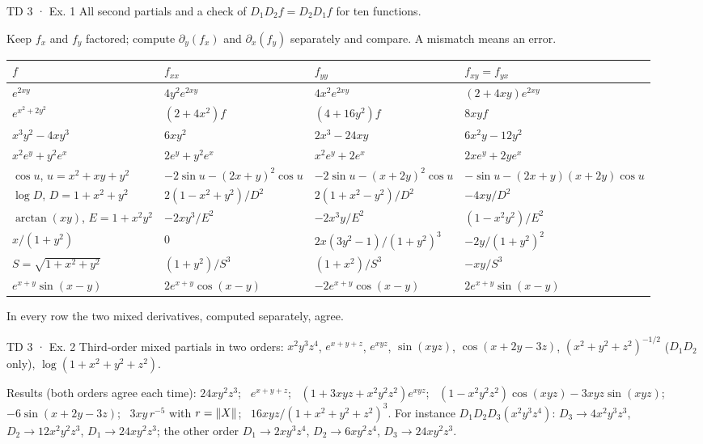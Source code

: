 \begin{problem}{TD 3 · Ex. 1}
All second partials and a check of $D_1D_2f=D_2D_1f$ for ten functions.
\end{problem}
\begin{hint}Keep $f_x$ and $f_y$ factored; compute $\partial_y(f_x)$ and $\partial_x(f_y)$ separately and
compare. A mismatch means an error.\end{hint}
\begin{solution}
\begin{center}\small
\begin{tabularx}{\linewidth}{@{}l Y Y Y@{}}
\toprule
$f$ & $f_{xx}$ & $f_{yy}$ & $f_{xy}=f_{yx}$\\ \midrule
$e^{2xy}$ & $4y^2e^{2xy}$ & $4x^2e^{2xy}$ & $(2+4xy)e^{2xy}$\\
$e^{x^2+2y^2}$ & $(2+4x^2)f$ & $(4+16y^2)f$ & $8xyf$\\
$x^3y^2-4xy^3$ & $6xy^2$ & $2x^3-24xy$ & $6x^2y-12y^2$\\
$x^2e^y+y^2e^x$ & $2e^y+y^2e^x$ & $x^2e^y+2e^x$ & $2xe^y+2ye^x$\\
$\cos u$, $u=x^2{+}xy{+}y^2$ & $-2\sin u-(2x{+}y)^2\cos u$ & $-2\sin u-(x{+}2y)^2\cos u$ & $-\sin u-(2x{+}y)(x{+}2y)\cos u$\\
$\log D$, $D=1{+}x^2{+}y^2$ & $2(1-x^2+y^2)/D^2$ & $2(1+x^2-y^2)/D^2$ & $-4xy/D^2$\\
$\arctan(xy)$, $E=1{+}x^2y^2$ & $-2xy^3/E^2$ & $-2x^3y/E^2$ & $(1-x^2y^2)/E^2$\\
$x/(1+y^2)$ & $0$ & $2x(3y^2-1)/(1+y^2)^3$ & $-2y/(1+y^2)^2$\\
$S=\sqrt{1+x^2+y^2}$ & $(1+y^2)/S^3$ & $(1+x^2)/S^3$ & $-xy/S^3$\\
$e^{x+y}\sin(x-y)$ & $2e^{x+y}\cos(x-y)$ & $-2e^{x+y}\cos(x-y)$ & $2e^{x+y}\sin(x-y)$\\
\bottomrule
\end{tabularx}
\end{center}
In every row the two mixed derivatives, computed separately, agree.
\end{solution}

\begin{problem}{TD 3 · Ex. 2}
Third-order mixed partials in two orders: $x^2y^3z^4$, $e^{x+y+z}$, $e^{xyz}$, $\sin(xyz)$,
$\cos(x+2y-3z)$, $(x^2+y^2+z^2)^{-1/2}$ ($D_1D_2$ only), $\log(1+x^2+y^2+z^2)$.
\end{problem}
\begin{solution}
Results (both orders agree each time): $24xy^2z^3$; \ $e^{x+y+z}$; \
$(1+3xyz+x^2y^2z^2)e^{xyz}$; \ $(1-x^2y^2z^2)\cos(xyz)-3xyz\sin(xyz)$; \ $-6\sin(x+2y-3z)$;
\ $3xy\,r^{-5}$ with $r=\left\lVert X\right\rVert$; \ $16xyz/(1+x^2+y^2+z^2)^3$.
For instance $D_1D_2D_3(x^2y^3z^4)$: $D_3\to4x^2y^3z^3$, $D_2\to12x^2y^2z^3$, $D_1\to24xy^2z^3$;
the other order $D_1\to2xy^3z^4$, $D_2\to6xy^2z^4$, $D_3\to24xy^2z^3$.
\end{solution}


